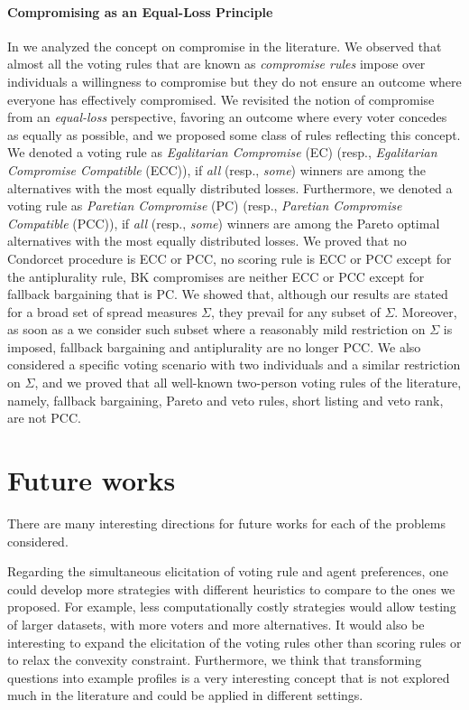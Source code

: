 \paragraph{Compromising as an Equal-Loss Principle}
In  we analyzed the concept on compromise in the literature. 
We observed that almost all the voting rules that are known as \textit{compromise rules} impose over individuals a willingness to compromise but they do not ensure an outcome where everyone has effectively compromised. 
We revisited the notion of compromise from an \emph{equal-loss} perspective, favoring an outcome where every voter concedes as equally as possible, and we proposed some class of rules reflecting this concept.
We denoted a voting rule as \textit{Egalitarian Compromise} (EC) (resp., \textit{Egalitarian Compromise Compatible} (ECC)), if \emph{all} (resp., \emph{some}) winners are among the alternatives with the most equally distributed losses.
Furthermore, we denoted a voting rule as \textit{Paretian Compromise} (PC) (resp., \textit{Paretian Compromise Compatible} (PCC)), if \emph{all} (resp., \emph{some}) winners are among the Pareto optimal alternatives with the most equally distributed losses.
We proved that no Condorcet procedure is ECC or PCC, no scoring rule is ECC or PCC except for the antiplurality rule, \acs{BK} compromises are neither ECC or PCC except for fallback bargaining that is PC.
We showed that, although our results are stated for a broad set of spread measures $\Sigma$, they prevail for any subset of $\Sigma$. Moreover, as soon as a we consider such subset where a reasonably mild restriction on $\Sigma$ is imposed, fallback bargaining and antiplurality are no longer PCC. 
We also considered a specific voting scenario with two individuals and a similar restriction on $\Sigma$, and we proved that all well-known two-person voting rules of the literature, namely, fallback bargaining, Pareto and veto rules, short listing and veto rank, are not PCC.


\section{Future works}
There are many interesting directions for future works for each of the problems considered.

Regarding the simultaneous elicitation of voting rule and agent preferences, one could develop more strategies with different heuristics to compare to the ones we proposed. For example, less computationally costly strategies would allow testing of larger datasets, with more voters and more alternatives. 
It would also be interesting to expand the elicitation of the voting rules other than scoring rules or to relax the convexity constraint. 
Furthermore, we think that transforming questions into example profiles is a very interesting concept that is not explored much in the literature and could be applied in different settings. 

